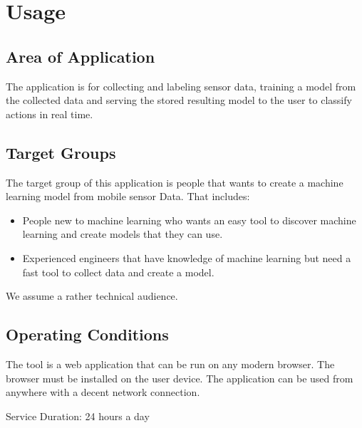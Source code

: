 \section{Usage}
\subsection{Area of Application}
The application is for collecting and labeling sensor data, training a model from the collected data and serving the stored resulting model to the user to classify actions in real time.

\subsection{Target Groups}
The target group of this application is people that wants to create a machine learning model from mobile sensor Data.
That includes: 
\begin{itemize}
    \item People new to machine learning who wants an easy tool to discover machine learning and create models that they can use.
    \item Experienced engineers that have knowledge of machine learning but need a fast tool to collect data and create a model.
\end{itemize}
We assume a rather technical audience.

\subsection{Operating Conditions}
The tool is a web application that can be run on any modern browser. The browser must be installed on the user device. The application can be used from anywhere with a decent network connection.

Service Duration: 24 hours a day